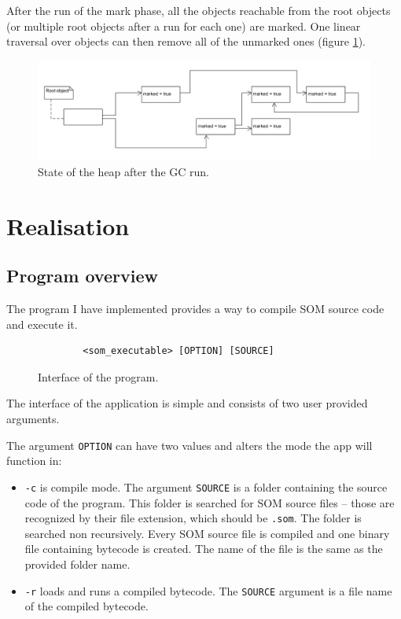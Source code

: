 \documentclass[thesis=M,english]{FITthesis}[2019/12/23]
\begin{document}
After the run of the mark phase, all the objects reachable from the root objects (or multiple root objects after a run for each one) are marked.
One linear traversal over objects can then remove all of the unmarked ones (figure \ref{fig:gc_step3}).

\begin{figure}[h!]
	\centering
	\includegraphics[width=\linewidth]{media/gc_ms_step3.png}
	\caption{State of the heap after the GC run.}
	\label{fig:gc_step3}
\end{figure}

\chapter{Realisation}

\section{Program overview}
The program I have implemented provides a way to compile SOM source code and execute it.

\begin{figure}[h!]
	\centering
	\begin{verbatim}
		<som_executable> [OPTION] [SOURCE]
	\end{verbatim}
	\caption{Interface of the program.}
	\label{fig:prog_interface}
\end{figure}

The interface of the application is simple and consists of two user provided arguments.

The argument \texttt{OPTION} can have two values and alters the mode the app will function in:
\begin{itemize}
	\item \texttt{-c} is compile mode. The argument \texttt{SOURCE} is a folder containing the source code of the program.
		This folder is searched for SOM source files -- those are recognized by their file extension, which should be \texttt{.som}.
		The folder is searched non recursively. Every SOM source file is compiled and one binary file containing bytecode is created.
		The name of the file is the same as the provided folder name.
	\item \texttt{-r} loads and runs a compiled bytecode. The \texttt{SOURCE} argument is a file name of the compiled bytecode.
\end{itemize}
\end{document}
